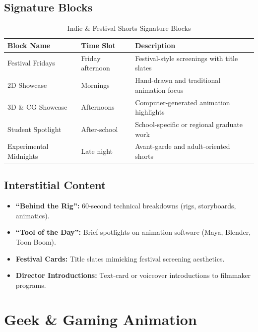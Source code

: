 \documentclass[12pt,letterpaper,twoside]{report}
\begin{document}
\subsection{Signature Blocks}

\begin{table}[H]
\centering
\caption{Indie \& Festival Shorts Signature Blocks}
\label{tab:indie-blocks}
\begin{tabular}{@{}L{4cm}L{2.5cm}L{7cm}@{}}
\toprule
\textbf{Block Name} & \textbf{Time Slot} & \textbf{Description} \\
\midrule
Festival Fridays & Friday afternoon & Festival-style screenings with title slates \\
\addlinespace
2D Showcase & Mornings & Hand-drawn and traditional animation focus \\
\addlinespace
3D \& CG Showcase & Afternoons & Computer-generated animation highlights \\
\addlinespace
Student Spotlight & After-school & School-specific or regional graduate work \\
\addlinespace
Experimental Midnights & Late night & Avant-garde and adult-oriented shorts \\
\bottomrule
\end{tabular}
\end{table}

\subsection{Interstitial Content}

\begin{itemize}[leftmargin=1.5cm]
    \item \textbf{``Behind the Rig'':} 60-second technical breakdowns (rigs, storyboards, animatics).
    \item \textbf{``Tool of the Day'':} Brief spotlights on animation software (Maya, Blender, Toon Boom).
    \item \textbf{Festival Cards:} Title slates mimicking festival screening aesthetics.
    \item \textbf{Director Introductions:} Text-card or voiceover introductions to filmmaker programs.
\end{itemize}

\section{Geek \& Gaming Animation}
\label{sec:gaming}
\end{document}
